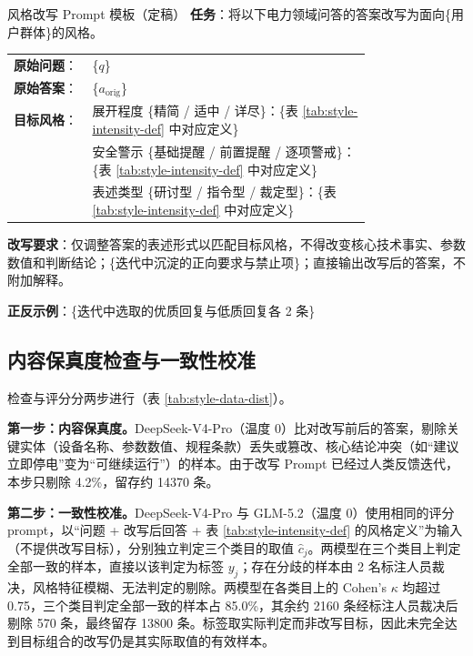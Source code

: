 \documentclass[fontset=fandol,type=master,campus=shenzhen,etitleauto=true]{hithesisbook}
\begin{document}
\begin{promptbox}{风格改写 Prompt 模板（定稿）}
\textbf{任务}：将以下电力领域问答的答案改写为面向\{用户群体\}的风格。\par\smallskip
\begin{tabular}{@{}l@{\;}p{0.78\linewidth}@{}}
\textbf{原始问题}： & \{$q$\} \\
\textbf{原始答案}： & \{$a_{\text{orig}}$\} \\
\textbf{目标风格}： & 展开程度 \{精简 / 适中 / 详尽\}：\{表 \ref{tab:style-intensity-def} 中对应定义\} \\
 & 安全警示 \{基础提醒 / 前置提醒 / 逐项警戒\}：\{表 \ref{tab:style-intensity-def} 中对应定义\} \\
 & 表述类型 \{研讨型 / 指令型 / 裁定型\}：\{表 \ref{tab:style-intensity-def} 中对应定义\} \\
\end{tabular}\par\smallskip
\textbf{改写要求}：仅调整答案的表述形式以匹配目标风格，不得改变核心技术事实、参数数值和判断结论；\{迭代中沉淀的正向要求与禁止项\}；直接输出改写后的答案，不附加解释。\par\smallskip
\textbf{正反示例}：\{迭代中选取的优质回复与低质回复各 2 条\}
\end{promptbox}

\subsection{内容保真度检查与一致性校准}\label{ux4e09ux8f6eux8d28ux91cfux7b5bux9009}

检查与评分分两步进行（表 \ref{tab:style-data-dist}）。

\textbf{第一步：内容保真度。}DeepSeek-V4-Pro（温度 0）比对改写前后的答案，剔除关键实体（设备名称、参数数值、规程条款）丢失或篡改、核心结论冲突（如“建议立即停电”变为“可继续运行”）的样本。由于改写 Prompt 已经过人类反馈迭代，本步只剔除 4.2\%，留存约 14370 条。

\textbf{第二步：一致性校准。}DeepSeek-V4-Pro 与 GLM-5.2（温度 0）使用相同的评分 prompt，以“问题 + 改写后回答 + 表 \ref{tab:style-intensity-def} 的风格定义”为输入（不提供改写目标），分别独立判定三个类目的取值 $\hat{c}_j$。两模型在三个类目上判定全部一致的样本，直接以该判定为标签 $y_j$；存在分歧的样本由 2 名标注人员裁决，风格特征模糊、无法判定的剔除。两模型在各类目上的 Cohen's $\kappa$ 均超过 0.75，三个类目判定全部一致的样本占 85.0\%，其余约 2160 条经标注人员裁决后剔除 570 条，最终留存 13800 条。标签取实际判定而非改写目标，因此未完全达到目标组合的改写仍是其实际取值的有效样本。
\end{document}
